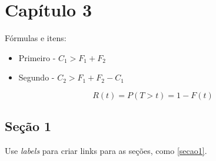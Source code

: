 \chapter[Capítulo 3]{Capítulo 3}
\label{ch:cap3}

Fórmulas e itens:

\begin{itemize}
    \item Primeiro
    \subitem - $C_1 > F_1 + F_2 $
    \item Segundo
    \subitem - $C_2 > F_1 + F_2 - C_1$
\end{itemize}

\begin{equation} \label{eq1}
R(t) = P(T > t) = 1 - F(t)
\end{equation}

\section{Seção 1} \label{secao1}

Use \textit{labels} para criar links para as seções, como \autoref{secao1}.

\lipsum[5-8]